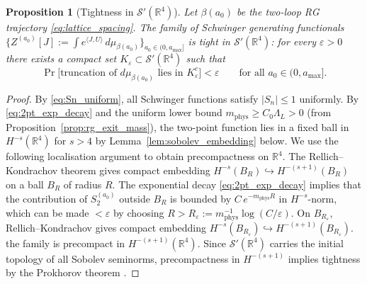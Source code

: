 \documentclass[11pt,a4paper]{amsart}
\newtheorem{proposition}[theorem]{Proposition}
\theoremstyle{definition}
\newcommand{\R}{\mathbb{R}}
\begin{document}
\begin{proposition}[Tightness in $\mathcal{S}'(\R^4)$]
\label{prop:tightness}
Let $\beta(a_0)$ be the two-loop RG trajectory \eqref{eq:lattice_spacing}.
The family of Schwinger generating functionals
$\bigl\{Z^{(a_0)}[J] := \int e^{\langle J, U\rangle}\,d\mu_{\beta(a_0)}\bigr\}_{a_0\in(0,a_{\max}]}$
is tight in $\mathcal{S}'(\R^4)$: for every $\varepsilon > 0$ there exists a
compact set $K_\varepsilon \subset \mathcal{S}'(\R^4)$ such that
\[
  \Pr\bigl[\text{truncation of } d\mu_{\beta(a_0)} \text{ lies in } K_\varepsilon^c\bigr]
  < \varepsilon
  \qquad \text{for all } a_0\in(0,a_{\max}].
\]
\end{proposition}

\begin{proof}
By \eqref{eq:Sn_uniform}, all Schwinger functions satisfy $|S_n|\le 1$ uniformly.
By \eqref{eq:2pt_exp_decay} and the uniform lower bound
$m_{\mathrm{phys}} \ge C_0\Lambda_L > 0$ (from Proposition~\ref{prop:rg_exit_mass}),
the two-point function lies in a fixed ball in $H^{-s}(\R^4)$ for $s > 4$
by Lemma~\ref{lem:sobolev_embedding} below.
We use the following localisation argument to obtain precompactness on $\R^4$.
The Rellich--Kondrachov theorem gives compact embedding
$H^{-s}(B_R) \hookrightarrow H^{-(s+1)}(B_R)$ on a ball $B_R$ of radius $R$.
The exponential decay \eqref{eq:2pt_exp_decay} implies that the contribution
of $S_2^{(a_0)}$ outside $B_R$ is bounded by $C\,e^{-m_{\mathrm{phys}} R}$
in $H^{-s}$-norm, which can be made $< \varepsilon$ by choosing $R > R_\varepsilon
:= m_{\mathrm{phys}}^{-1}\log(C/\varepsilon)$.  On $B_{R_\varepsilon}$,
Rellich--Kondrachov gives compact embedding $H^{-s}(B_{R_\varepsilon})
\hookrightarrow H^{-(s+1)}(B_{R_\varepsilon})$.
the family is precompact in $H^{-(s+1)}(\R^4)$.  Since $\mathcal{S}'(\R^4)$
carries the initial topology of all Sobolev seminorms, precompactness in
$H^{-(s+1)}$ implies tightness by the Prokhorov theorem
\cite[Thm.~5.2]{Billingsley}.
\end{proof}
\end{document}

